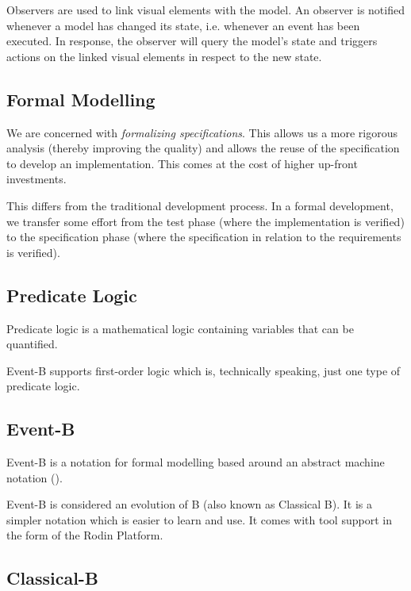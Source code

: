 \documentclass[twoside,10pt]{book}
\begin{document}
Observers are used to link visual elements with the model.
An observer is notified whenever a model has changed its state, i.e. whenever an event has been executed.
In response, the observer will query the model's state and triggers actions on the linked visual elements in respect to the new state.

\subsection{Formal Modelling}

We are concerned with \textit{formalizing specifications}.  This allows us a more rigorous analysis (thereby improving the quality) and allows the reuse of the specification to develop an implementation.  This comes at the cost of higher up-front investments.

This differs from the traditional development process. In a formal development, we transfer some effort from the test phase (where the implementation is verified) to the specification phase (where the specification in relation to the requirements is verified).

\subsection{Predicate Logic}
\label{predicate_logic}

Predicate logic is a mathematical logic containing variables that can be quantified.

Event-B supports first-order logic which is, technically speaking, just one type of predicate logic.

\subsection{Event-B}
\label{eventb}

Event-B is a notation for formal modelling based around an abstract machine notation ().

Event-B is considered an evolution of B (also known as Classical B). It is a simpler notation which is easier to learn and use. It comes with tool support in the form of the Rodin Platform.

\subsection{Classical-B}
\label{classicalb}
\end{document}
